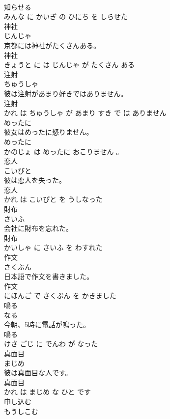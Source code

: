 \documentclass[8pt]{extreport}
\begin{document}
\begin{CJK}{UTF8}{min}
\\	知らせる 
\\	みんな に かいぎ の ひにち を しらせた			
\\	神社	
\\	じんじゃ			
\\	京都には神社がたくさんある。	
\\	神社 
\\	きょうと に は じんじゃ が たくさん ある			
\\	注射	
\\	ちゅうしゃ			
\\	彼は注射があまり好きではありません。	
\\	注射 
\\	かれ は ちゅうしゃ が あまり すき で は ありません			
\\	めったに	
\\	彼女はめったに怒りません。	
\\	めったに 
\\	かのじょ は めったに おこりません 。			
\\	恋人	
\\	こいびと			
\\	彼は恋人を失った。	
\\	恋人 
\\	かれ は こいびと を うしなった			
\\	財布	
\\	さいふ			
\\	会社に財布を忘れた。	
\\	財布 
\\	かいしゃ に さいふ を わすれた			
\\	作文	
\\	さくぶん			
\\	日本語で作文を書きました。	
\\	作文 
\\	にほんご で さくぶん を かきました			
\\	鳴る	
\\	なる			
\\	今朝、5時に電話が鳴った。	
\\	鳴る 
\\	けさ ごじ に でんわ が なった			
\\	真面目	
\\	まじめ			
\\	彼は真面目な人です。	
\\	真面目 
\\	かれ は まじめ な ひと です			
\\	申し込む	
\\	もうしこむ			

\end{CJK}
\end{document}
